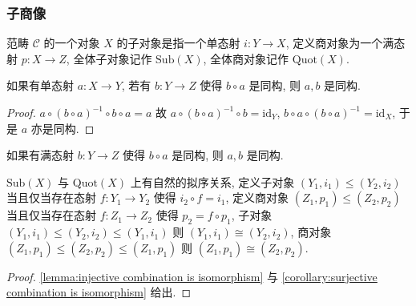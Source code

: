 \subsubsection{子商像}

\begin{definition}
    范畴 \(\mathcal{C}\) 的一个对象 \(X\) 的子对象是指一个单态射 \(i : Y \to X\),
    定义商对象为一个满态射 \(p : X \to Z\), 全体子对象记作 \(\mathrm{Sub} (X)\), 全体商对象记作 \(\mathrm{Quot} (X)\).
\end{definition}

\begin{lemma}
    \label {lemma:injective combination is isomorphism}
    如果有单态射 \(a : X \to Y\), 若有 \(b : Y \to Z\) 使得 \(b \circ a\) 是同构, 则 \(a,b\) 是同构.

    \begin{proof}
        \(a \circ {(b \circ a)}^{-1} \circ b \circ a = a\) 故 \(a \circ {(b \circ a)}^{-1} \circ b = \mathrm{id}_Y\), \(b \circ a \circ {(b \circ a)}^{-1} = \mathrm{id}_X\),
        于是 \(a\) 亦是同构.
    \end{proof}
\end{lemma}

\begin{corollary}
    \label {corollary:surjective combination is isomorphism}
    如果有满态射 \(b : Y \to Z\) 使得 \(b \circ a\) 是同构, 则 \(a,b\) 是同构.
\end{corollary}

\begin{definition}
    \(\mathrm{Sub} (X)\) 与 \(\mathrm{Quot} (X)\) 上有自然的拟序关系, 定义子对象 \((Y_1,i_1) \leq (Y_2,i_2)\) 当且仅当存在态射 \(f : Y_1 \to Y_2\) 使得 \(i_2 \circ f = i_1\),
    定义商对象 \((Z_1,p_1) \leq (Z_2,p_2)\) 当且仅当存在态射 \(f : Z_1 \to Z_2\) 使得 \(p_2 = f \circ p_1\), 子对象 \((Y_1,i_1) \leq (Y_2,i_2) \leq (Y_1,i_1)\) 则 \((Y_1,i_1) \cong (Y_2,i_2)\),
    商对象 \((Z_1,p_1) \leq (Z_2,p_2) \leq (Z_1,p_1)\) 则 \((Z_1,p_1) \cong (Z_2,p_2)\).

    \begin{proof}
        \ref{lemma:injective combination is isomorphism} 与 \ref{corollary:surjective combination is isomorphism} 给出.
    \end{proof}
\end{definition}

